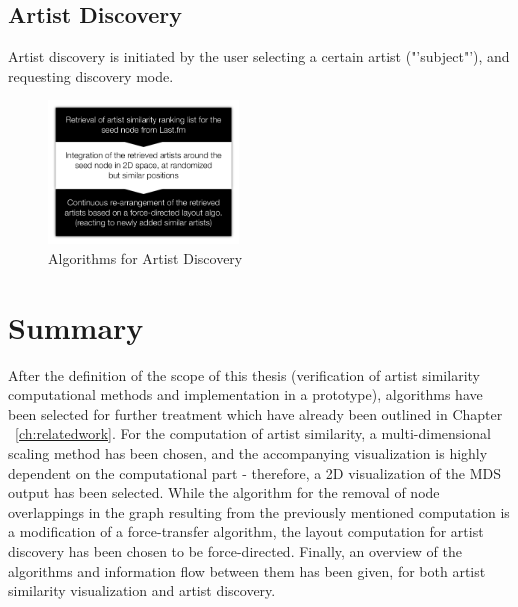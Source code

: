 \subsection{Artist Discovery}

Artist discovery is initiated by the user selecting a certain artist ("'subject"'), and requesting discovery mode.

\begin{figure}[H]
  \centering
    \includegraphics[width=0.45\textwidth]{figures/algorithm_flow_artist_discovery}
  \caption{Algorithms for Artist Discovery}
  \label{fig:algorithm_flow_artist_discovery}
\end{figure}

\section{Summary}

After the definition of the scope of this thesis (verification of artist similarity computational methods and implementation in a prototype), algorithms have been selected for further treatment which have already been outlined in Chapter ~\ref{ch:relatedwork}. For the computation of artist similarity, a multi-dimensional scaling method has been chosen, and the accompanying visualization is highly dependent on the computational part - therefore, a 2D visualization of the MDS output has been selected. 
While the algorithm for the removal of node overlappings in the graph resulting from the previously mentioned computation is a modification of a force-transfer algorithm, the layout computation for artist discovery has been chosen to be force-directed. Finally, an overview of the algorithms and information flow between them has been given, for both artist similarity visualization and artist discovery.